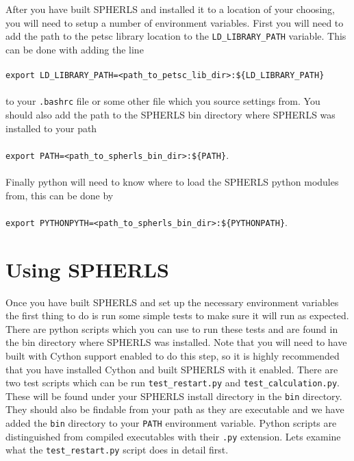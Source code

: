 \documentclass[12pt,a4paper]{book}
\begin{document}
After you have built SPHERLS and installed it to a location of your choosing, you will need to setup a number of environment variables. First you will need to add the path to the petsc library location to the {\tt LD\_LIBRARY\_PATH} variable. This can be done with adding the line\\
 \\
{\tt export LD\_LIBRARY\_PATH=<path\_to\_petsc\_lib\_dir>:\$\{LD\_LIBRARY\_PATH\}}\\
 \\
to your {\tt .bashrc} file or some other file which you source settings from. You should also add the path to the SPHERLS bin directory where SPHERLS was installed to your path \\
 \\
{\tt export PATH=<path\_to\_spherls\_bin\_dir>:\$\{PATH\}}.\\
 \\
Finally python will need to know where to load the SPHERLS python modules from, this can be done by \\
 \\
{\tt export PYTHONPYTH=<path\_to\_spherls\_bin\_dir>:\$\{PYTHONPATH\}}.

\chapter{Using SPHERLS}
Once you have built SPHERLS and set up the necessary environment variables the first thing to do is run some simple tests to make sure it will run as expected. There are python scripts which you can use to run these tests and are found in the bin directory where SPHERLS was installed. Note that you will need to have built with Cython support enabled to do this step, so it is highly recommended that you have installed Cython and built SPHERLS with it enabled. There are two test scripts which can be run {\tt test\_restart.py} and {\tt test\_calculation.py}. These will be found under your SPHERLS install directory in the {\tt bin} directory. They should also be findable from your path as they are executable and we have added the {\tt bin} directory to your {\tt PATH} environment variable. Python scripts are distinguished from compiled executables with their {\tt .py} extension. Lets examine what the {\tt test\_restart.py} script does in detail first.
\end{document}
